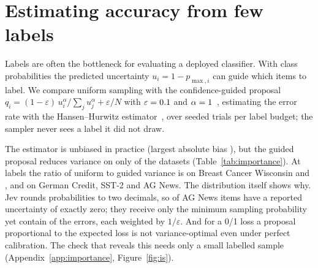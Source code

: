 \section{Estimating accuracy from few labels}
\label{sec:importance}

Labels are often the bottleneck for evaluating a deployed classifier. With class probabilities
the predicted uncertainty $u_i = 1 - p_{\max,i}$ can guide which items to label. We compare
uniform sampling with the confidence-guided proposal
$q_i = (1 - \varepsilon)\,u_i^{\alpha} / \sum_j u_j^{\alpha} + \varepsilon / N$ with
$\varepsilon = 0.1$ and $\alpha = 1$~\citep{sawade2010are,kossen2021active},
estimating the error rate with the Hansen--Hurwitz estimator~\citep{hansen1943}, over
\ISTrials{} seeded trials per label budget; the sampler never sees a label it did not draw.

\begin{table}[t]
  \caption{RMSE of the accuracy estimate from $n$ labels, for uniform and confidence-guided
    sampling, and the ratio of their variances (uniform over guided; above 1 favours guided
    sampling), over \ISTrials{} trials.}
  \label{tab:importance}
  \centering\small
  \setlength{\tabcolsep}{4pt}
  \fittable{}
\end{table}

The estimator is unbiased in practice (largest absolute bias \IsMaxAbsBias), but the guided
proposal reduces variance on only \IsDatasetsGuidedWins{} of the \NDatasets{} datasets
(Table~\ref{tab:importance}). At
\ISMaxBudget{} labels the ratio of uniform to guided variance is \IsVarRatioWdbcNFourZeroZero{}
on Breast Cancer Wisconsin and \IsVarRatioGermanNFourZeroZero, \IsVarRatioSstNFourZeroZero{} and
\IsVarRatioAgnewsNFourZeroZero{} on German Credit, SST-2 and AG News. The distribution itself
shows why. Jev rounds probabilities to two decimals, so \IsZeroUncertaintyAgnews{} of
\IsPoolAgnews{} AG News items have a reported uncertainty of exactly zero; they receive only the
minimum sampling probability yet contain \IsErrorsZeroUncertaintyAgnews{} of the
\IsErrorsAgnews{} errors, each weighted by $1/\varepsilon$. And for a 0/1 loss a proposal
proportional to the expected loss is not variance-optimal even under perfect calibration. The
check that reveals this needs only a small labelled sample (Appendix~\ref{app:importance},
Figure~\ref{fig:is}).
